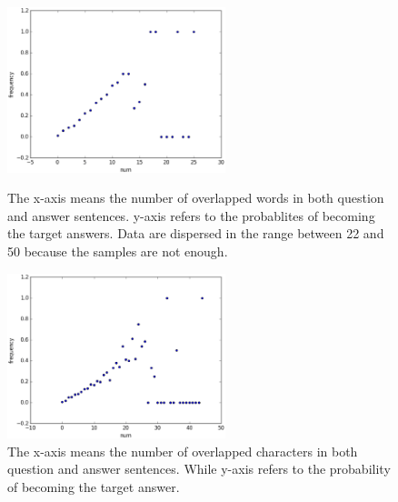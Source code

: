 \documentclass{llncs}
\begin{document}
\begin{figure}[htb]
	\begin{minipage}[t]{0.5\linewidth} 
	\subfigure

		\includegraphics[width=2.5in]{figures/word_overlap.eps}
		\caption{The x-axis means the number of overlapped words in both question and answer sentences. y-axis refers to the probablites of  becoming the target answers. Data are dispersed in the range between 22 and 50 because the samples are not enough.}
		\label{fig:word_overlap}
	\end{minipage}
	\hspace{1ex} 
	\begin{minipage}[t]{0.5\linewidth} 
	\subfigure
	\centering
		\includegraphics[width=2.5in]{figures/character_overlap.eps}
		\caption{The x-axis means the number of overlapped characters in both question and answer sentences. While y-axis refers to the probability of becoming the target answer.}
		\label{fig:character_overlap}
	\end{minipage}
\end{figure}

\end{document}
